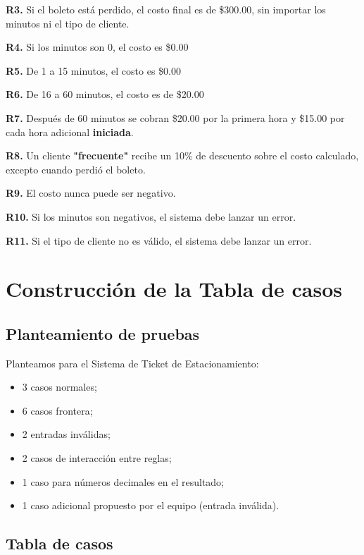 \documentclass[11pt,letterpaper]{article}
\begin{document}
\textbf{R3.} Si el boleto está perdido, el costo final es de \$300.00, sin importar los minutos ni el tipo de cliente.

\textbf{R4.} Si los minutos son 0, el costo es \$0.00

\textbf{R5.} De 1 a 15 minutos, el costo es \$0.00

\textbf{R6.} De 16 a 60 minutos, el costo es de \$20.00

\textbf{R7.} Después de 60 minutos se cobran \$20.00 por la primera hora y \$15.00 por cada hora adicional \textbf{iniciada}.

\textbf{R8.} Un cliente \textbf{"frecuente"} recibe un 10\% de descuento sobre el costo calculado, excepto cuando perdió el boleto.

\textbf{R9.} El costo nunca puede ser negativo.

\textbf{R10.} Si los minutos son negativos, el sistema debe lanzar un error.

\textbf{R11.} Si el tipo de cliente no es válido, el sistema debe lanzar un error.

\endgroup
\section{Construcción de la Tabla de casos}
\label{sec:orge1bdbe2}

\subsection{Planteamiento de pruebas}
\label{sec:org4491954}

Planteamos para el Sistema de Ticket de Estacionamiento:

\begin{itemize}
\item 3 casos normales;
\item 6 casos frontera;
\item 2 entradas inválidas;
\item 2 casos de interacción entre reglas;
\item 1 caso para números decimales en el resultado;
\item 1 caso adicional propuesto por el equipo (entrada inválida).
\end{itemize}
\subsection{Tabla de casos}
\label{sec:orgb976c21}


%
%
\end{document}
